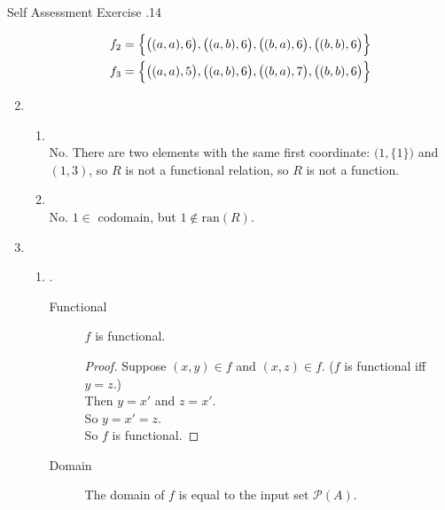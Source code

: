 \documentclass[\main/notes.tex]{subfiles}
\begin{document}
\begin{exercise}{Self Assessment Exercise \thechapter.14}
\begin{enumerate}
\begin{align*}
								f_{2} &= \Bigl\{\bigl((a, a), 6\bigr), \bigl((a, b), 6\bigr), \bigl((b, a), 6\bigr), \bigl((b, b), 6\bigr)\Bigr\}\\
								f_{3} &= \Bigl\{\bigl((a, a), 5\bigr), \bigl((a, b), 6\bigr), \bigl((b, a), 7\bigr), \bigl((b, b), 6\bigr)\Bigr\}
							\end{align*}
						\item {}
							\begin{enumerate}[label=(\alph*)]
								\item {}\\
									No. There are two elements with the same first coordinate: $\bigl(1, \{1\}\bigr)$ and $(1, 3)$, so $R$ is not a functional relation, so $R$ is not a function.
								\item {}\\
									No. $1 \in$ codomain, but $1 \notin \mathrm{ran}(R)$.
							\end{enumerate}
						\pagebreak
						\item {}
							\begin{enumerate}[label=(\alph*)]
								\item {}.
									\begin{description}
										\item[Functional] $f$ is functional.
											\begin{proof}
												Suppose $(x, y) \in f$ and $(x, z) \in f$. ($f$ is functional iff $y = z$.)\\
												Then $y = x'$ and $z = x'$.\\
												So $y = x' = z$.\\
												So $f$ is functional.
											\end{proof}
										\item[Domain] The domain of $f$ is equal to the input set $\mathcal{P}(A)$.

\end{description}
\end{enumerate}
\end{enumerate}
\end{exercise}
\end{document}
